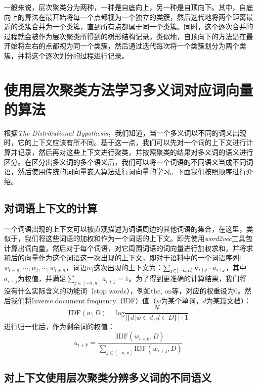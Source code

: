 一般来说，层次聚类分为两种，一种是自底向上，另一种是自顶向下。其中，自底向上的算法在最开始将每一个点都视为一个独立的类簇，然后迭代地将两个距离最近的类簇合并为一个类簇，直到所有点都属于同一个类簇。同时，这个逐次合并的过程就会被作为层次聚类所得到的树形结构记录。类似地，自顶向下的方法是在最开始将左右的点都视为同一个类簇，然后通过迭代每次将一个类簇划分为两个类簇，并将这个逐次划分的过程进行记录。

\section{使用层次聚类方法学习多义词对应词向量的算法}

根据\emph{The Distributional Hypothesis}，我们知道，当一个多义词以不同的词义出现时，它的上下文应该有所不同。基于这一点，我们可以先对一个词的上下文进行计算并记录，然后再对这些上下文进行聚类，并按照聚类的结果对多义词的语义进行区分。在区分出多义词的多个语义后，我们可以将一个词语的不同语义当成不同词语，然后使用传统的词向量嵌入算法进行词向量的学习。下面我们按照顺序进行介绍。

\subsection{对词语上下文的计算}

一个词语出现的上下文可以被直观描述为词语周边的其他词语的集合，在这里，类似于\citep{huang2012improving}，我们将这些词语的加权和作为一个词语的上下文。即先使用\emph{word2vec}工具包计算出词向量，然后对于每个词语，对它周围词语的词向量进行加权求和，并将求和后的向量作为这个词语这一次出现的上下文，即对于语料中的一个词语序列:$w_{i-n}, \cdots,w_{i}, \cdots, w_{i+n}$，词语$w_i$这次出现的上下文为：$\sum_{j \in [-n, n]} {{\mathbf v}}_{i+j} \cdot a_{i+j}$，其中$a_{i+j}$为权值，并满足$\sum_{j \in [-n, n]} a_{i+j} = 1$。为了得到更准确的计算结果，我们将没有什么实际含义的功能词（stop words），例如the, on等，对应的权重设为0。然后我们将Inverse document frequency（IDF）值（$w$为某个单词，$d$为某篇文档）：
\begin{equation*}
\mathrm{IDF}(w, D) = \mathrm{log} \frac{N}{|\{d | w \in d, d \in D\}| + 1}
\end{equation*}
进行归一化后，作为剩余词的权值：
\begin{equation*}
a_{i+k} = \frac{\mathrm{IDF}(w_{i+k}, D)}{\sum_{j \in [-n, n]} \mathrm{IDF}(w_{i+j}, D)}
\end{equation*}

\subsection{对上下文使用层次聚类分辨多义词的不同语义}

